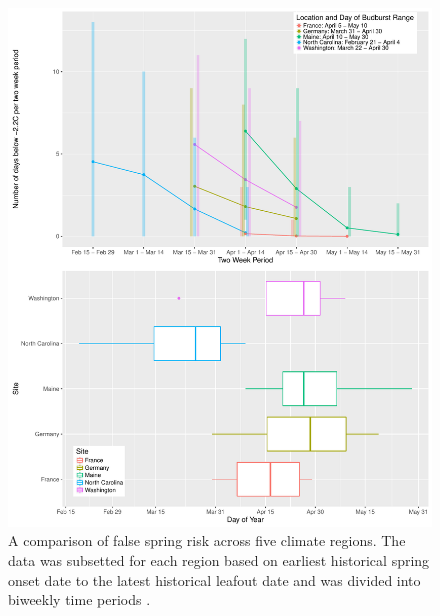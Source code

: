 \documentclass{article}\usepackage[]{graphicx}\usepackage[]{color}
\begin{document}
\begin{figure} [H] 
\begin{center}
\includegraphics{..//figure/RegionalRisk.pdf}
\caption{A comparison of false spring risk across five climate regions. The data was subsetted for each region based on earliest historical spring onset date to the latest historical leafout date and was divided into biweekly time periods \citep{Schaber2005, White2009, Soudani2012, USA-NPN2016}.}\label{fig:regional} 
\end{center}
\end{figure}


\end{document}
